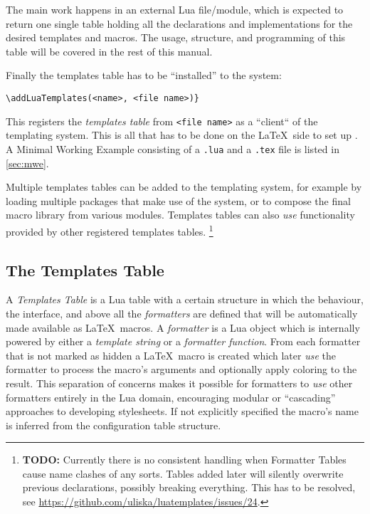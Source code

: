 \documentclass{scrartcl}
\begin{document}
\medskip

The main work happens in an external Lua file/module, which is expected to
return one single table holding all the declarations and implementations for the
desired templates and macros.  The usage, structure, and programming of this
table will be covered in the rest of this manual.

\medskip

Finally the templates table has to be “installed” to the system:

\begin{verbatim}
\addLuaTemplates(<name>, <file name>)}
\end{verbatim}

This registers the \emph{templates table} from \texttt{<file name>} as a
“client“ of the templating system.  This is all that has to be done on the
\LaTeX\ side to set up .  A Minimal Working Example
consisting of a \texttt{.lua} and a \texttt{.tex} file is listed in
\vref{sec:mwe}.

Multiple templates tables can be added to the templating system, for example by
loading multiple packages that make use of the system, or to compose the final
macro library from various modules.  Templates tables can also \emph{use}
functionality provided by other registered templates tables.%
\footnote{\textbf{TODO:} Currently there is no consistent handling when
Formatter Tables cause name clashes of any sorts. Tables added later will
silently overwrite previous declarations, possibly breaking everything. This has
to be resolved, see \url{https://github.com/uliska/luatemplates/issues/24}.}


\subsection{The Templates Table}
\label{sec:templates-table}

A \emph{Templates Table} is a Lua table with a certain structure in which the
behaviour, the interface, and above all the \emph{formatters} are defined that
will be automatically made available as \LaTeX\ macros. A \emph{formatter} is a
Lua object which is internally powered by either a \emph{template string} or a
\emph{formatter function}.  From each formatter that is not marked as hidden a
\LaTeX\ macro is created which later \emph{use} the formatter to process the
macro's arguments and optionally apply coloring to the result. This separation
of concerns makes it possible for formatters to \emph{use} other formatters
entirely in the Lua domain, encouraging modular or “cascading” approaches to
developing stylesheets. If not explicitly specified the macro's name is inferred
from the configuration table structure.
\end{document}
